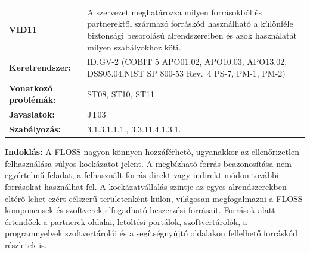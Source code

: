 \documentclass[12pt,magyar,a4paper,oneside]{scrreprt}
\begin{document}
\begin{longtable}[]{@{}ll@{}}
\toprule
\endhead
\begin{minipage}[t]{0.16\columnwidth}\raggedright
\textbf{VID11}\strut
\end{minipage} & \begin{minipage}[t]{0.79\columnwidth}\raggedright
A szervezet meghatározza milyen forrásokból és partnerektől származó
forráskód használható a különféle biztonsági besorolású alrendszereiben
és azok használatát milyen szabályokhoz köti.\strut
\end{minipage}\tabularnewline
\begin{minipage}[t]{0.16\columnwidth}\raggedright
\textbf{Keretrendszer:}\strut
\end{minipage} & \begin{minipage}[t]{0.79\columnwidth}\raggedright
ID.GV-2 (COBIT 5 APO01.02, APO10.03, APO13.02, DSS05.04,NIST SP 800-53
Rev.~4 PS-7, PM-1, PM-2)\strut
\end{minipage}\tabularnewline
\begin{minipage}[t]{0.16\columnwidth}\raggedright
\textbf{Vonatkozó problémák:}\strut
\end{minipage} & \begin{minipage}[t]{0.79\columnwidth}\raggedright
ST08, ST10, ST11\strut
\end{minipage}\tabularnewline
\begin{minipage}[t]{0.16\columnwidth}\raggedright
\textbf{Javaslatok:}\strut
\end{minipage} & \begin{minipage}[t]{0.79\columnwidth}\raggedright
JT03\strut
\end{minipage}\tabularnewline
\begin{minipage}[t]{0.16\columnwidth}\raggedright
\textbf{Szabályozás:}\strut
\end{minipage} & \begin{minipage}[t]{0.79\columnwidth}\raggedright
3.1.3.1.1.1., 3.3.11.4.1.3.1.\strut
\end{minipage}\tabularnewline
\bottomrule
\end{longtable}

\textbf{Indoklás: } A FLOSS nagyon könnyen hozzáférhető, ugyanakkor az
ellenőrizetlen felhasználása súlyos kockázatot jelent. A megbízható
forrás beazonosítása nem egyértelmű feladat, a felhasznált forrás direkt
vagy indirekt módon további forrásokat használhat fel. A
kockázatvállalás szintje az egyes alrendszerekben eltérő lehet ezért
célszerű területenként külön, világosan megfogalmazni a FLOSS
komponensek és szoftverek elfogadható beszerzési forrásait. Források
alatt értendőek a partnerek oldalai, letöltési portálok,
szoftvertárolók, a programnyelvek szoftvertárolói és a segítségnyújtó
oldalakon fellelhető forráskód részletek is.
\end{document}
